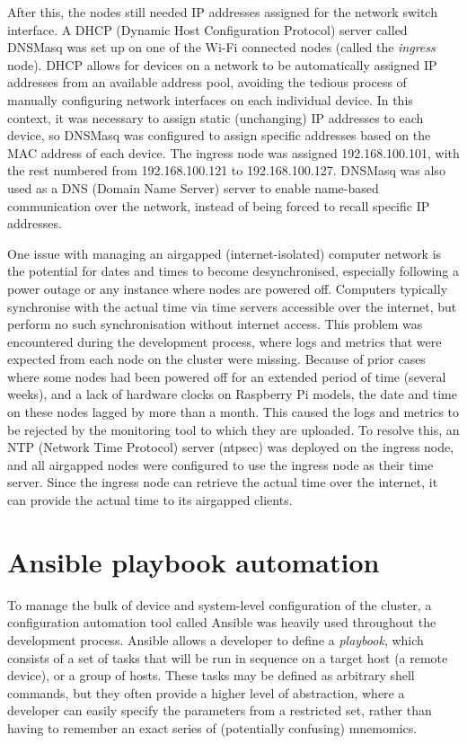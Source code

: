 After this, the nodes still needed IP addresses assigned for the network switch interface. A DHCP (Dynamic Host Configuration Protocol) server called DNSMasq was set up on one of the Wi-Fi connected nodes (called the \textit{ingress} node). DHCP allows for devices on a network to be automatically assigned IP addresses from an available address pool, avoiding the tedious process of manually configuring network interfaces on each individual device. In this context, it was necessary to assign static (unchanging) IP addresses to each device, so DNSMasq was configured to assign specific addresses based on the MAC address of each device. The ingress node was assigned 192.168.100.101, with the rest numbered from 192.168.100.121 to 192.168.100.127. DNSMasq was also used as a DNS (Domain Name Server) server to enable name-based communication over the network, instead of being forced to recall specific IP addresses.


One issue with managing an airgapped (internet-isolated) computer network is the potential for dates and times to become desynchronised, especially following a power outage or any instance where nodes are powered off. Computers typically synchronise with the actual time via time servers accessible over the internet, but perform no such synchronisation without internet access. This problem was encountered during the development process, where logs and metrics that were expected from each node on the cluster were missing. Because of prior cases where some nodes had been powered off for an extended period of time (several weeks), and a lack of hardware clocks on Raspberry Pi models, the date and time on these nodes lagged by more than a month. This caused the logs and metrics to be rejected by the monitoring tool to which they are uploaded. To resolve this, an NTP (Network Time Protocol) server (ntpsec) was deployed on the ingress node, and all airgapped nodes were configured to use the ingress node as their time server. Since the ingress node can retrieve the actual time over the internet, it can provide the actual time to its airgapped clients.

\section{Ansible playbook automation}

To manage the bulk of device and system-level configuration of the cluster, a configuration automation tool called Ansible was heavily used throughout the development process. Ansible allows a developer to define a \textit{playbook}, which consists of a set of tasks that will be run in sequence on a target host (a remote device), or a group of hosts. These tasks may be defined as arbitrary shell commands, but they often provide a higher level of abstraction, where a developer can easily specify the parameters from a restricted set, rather than having to remember an exact series of (potentially confusing) mnemomics.

